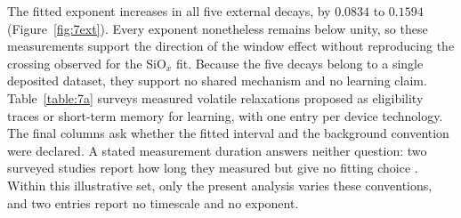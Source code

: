 \noindent The fitted exponent increases in all five external decays, by $0.0834$ to $0.1594$
(Figure~\ref{fig:7ext}). Every exponent nonetheless remains below unity, so these measurements support the direction of
the window effect without reproducing the crossing observed for the SiO$_x$ fit. Because the five decays
belong to a single deposited dataset, they support no shared mechanism and no learning claim.\\

\noindent Table~\ref{table:7a} surveys measured volatile relaxations proposed as eligibility traces or short-term
memory for learning, with one entry per device technology. The final columns ask whether the fitted interval and the
background convention were declared. A stated measurement duration answers neither question: two surveyed
studies report how long they measured but give no fitting choice
\cite{legallo2018collective, covi2021switching}. Within this illustrative set, only the present analysis varies these
conventions, and two entries report no timescale and no exponent.\\

